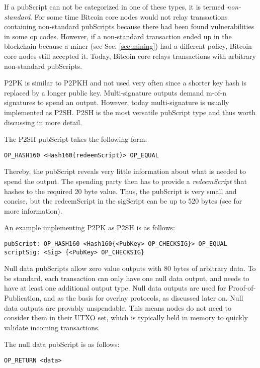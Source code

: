 If a pubScript can not be categorized in one of these types, it is termed \emph{non-standard}. For some time Bitcoin core nodes would not relay transactions containing non-standard pubScripts because there had been found vulnerabilities in some op codes. However, if a non-standard transaction ended up in the blockchain because a miner  (see Sec. \ref{sec:mining}) had a different policy, Bitcoin core nodes still accepted it. Today, Bitcoin core relays transactions with arbitrary non-standard pubScripts.

P2PK is similar to P2PKH and not used very often since a shorter key hash is replaced by a longer public key. Multi-signature outputs demand m-of-n signatures to spend an output. However, today multi-signature is usually implemented as P2SH. P2SH is the most versatile pubScript type and thus worth discussing in more detail.

The P2SH pubScript takes the following form:

\begin{lstlisting}
OP_HASH160 <Hash160(redeemScript)> OP_EQUAL
\end{lstlisting}

Thereby, the pubScript reveals very little information about what is needed to spend the output. The spending party then has to provide a \emph{redeemScript} that hashes to the required 20 byte value. Thus, the pubScript is very small and concise, but the redeemScript in the sigScript can be up to 520 bytes (see \parencite{bip16} for more information). 

An example implementing P2PK as P2SH is as follows:

\begin{lstlisting}[breaklines]
pubScript: OP_HASH160 <Hash160{<PubKey> OP_CHECKSIG}> OP_EQUAL
scriptSig: <Sig> {<PubKey> OP_CHECKSIG}
\end{lstlisting}

Null data pubScripts allow zero value outputs with 80 bytes of arbitrary data. To be standard, each transaction can only have one null data output, and needs to have at least one additional output type. Null data outputs are used for Proof-of-Publication, and as the basis for overlay protocols, as discussed later on. Null data outputs are provably unspendable. This means nodes do not need to consider them in their UTXO set, which is typically held in memory to quickly validate incoming transactions. 

The null data pubScript is as follows:
\begin{lstlisting}
OP_RETURN <data>
\end{lstlisting}

